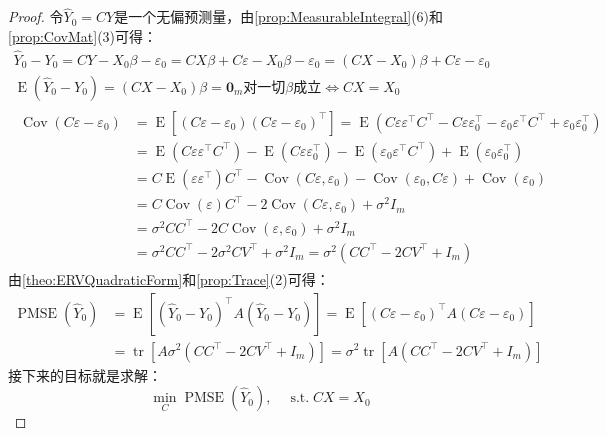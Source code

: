 \begin{proof}
	令$\widehat{Y}_0=CY$是一个无偏预测量，由\cref{prop:MeasurableIntegral}(6)和\cref{prop:CovMat}(3)可得：
	\begin{gather*}
		\widehat{Y}_0-Y_0=CY-X_0\beta-\varepsilon_0=CX\beta+C\varepsilon-X_0\beta-\varepsilon_0=(CX-X_0)\beta+C\varepsilon-\varepsilon_0 \\
		\operatorname{E}(\widehat{Y}_0-Y_0)=(CX-X_0)\beta=\mathbf{0}_m\text{对一切$\beta$成立}\iff CX=X_0 \\
		\begin{aligned}
			\operatorname{Cov}(C\varepsilon-\varepsilon_0)&=\operatorname{E}[(C\varepsilon-\varepsilon_0)(C\varepsilon-\varepsilon_0)^{\top}]=\operatorname{E}(C\varepsilon\varepsilon^{\top}C^{\top}-C\varepsilon\varepsilon_0^{\top}-\varepsilon_0\varepsilon^{\top}C^{\top}+\varepsilon_0\varepsilon_0^{\top}) \\
			&=\operatorname{E}(C\varepsilon\varepsilon^{\top}C^{\top})-\operatorname{E}(C\varepsilon\varepsilon_0^{\top})-\operatorname{E}(\varepsilon_0\varepsilon^{\top}C^{\top})+\operatorname{E}(\varepsilon_0\varepsilon_0^{\top}) \\
			&=C\operatorname{E}(\varepsilon\varepsilon^{\top})C^{\top}-\operatorname{Cov}(C\varepsilon,\varepsilon_0)-\operatorname{Cov}(\varepsilon_0,C\varepsilon)+\operatorname{Cov}(\varepsilon_0) \\
			&=C\operatorname{Cov}(\varepsilon)C^{\top}-2\operatorname{Cov}(C\varepsilon,\varepsilon_0)+\sigma^2I_m \\
			&=\sigma^2CC^{\top}-2C\operatorname{Cov}(\varepsilon,\varepsilon_0)+\sigma^2I_m \\
			&=\sigma^2CC^{\top}-2\sigma^2CV^{\top}+\sigma^2I_m=\sigma^2(CC^{\top}-2CV^{\top}+I_m)
		\end{aligned}
	\end{gather*}
	由\cref{theo:ERVQuadraticForm}和\cref{prop:Trace}(2)可得：
	\begin{align*}
		\operatorname{PMSE}(\widehat{Y}_0)&=\operatorname{E}[(\widehat{Y}_0-Y_0)^{\top}A(\widehat{Y}_0-Y_0)] =\operatorname{E}[(C\varepsilon-\varepsilon_0)^{\top}A(C\varepsilon-\varepsilon_0)] \\
		&=\operatorname{tr}[A\sigma^2(CC^{\top}-2CV^{\top}+I_m)] =\sigma^2\operatorname{tr}[A(CC^{\top}-2CV^{\top}+I_m)]
	\end{align*}
	接下来的目标就是求解：
	\begin{equation*}
		\min_{C}\operatorname{PMSE}(\widehat{Y}_0),\quad\operatorname{s.t.}CX=X_0
	\end{equation*}\par

\end{proof}
